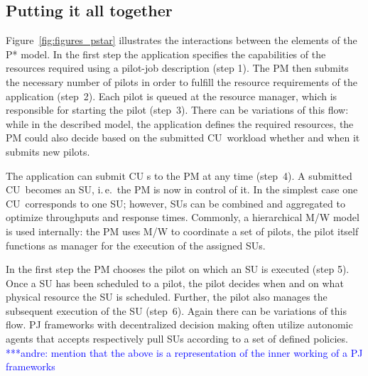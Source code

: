 \documentclass[conference,final]{IEEEtran}
\newcommand{\alnote}[1]{ {\textcolor{blue} { ***andre: #1 }}}
\newcommand{\alnote}[1]{}
\newcommand{\cu}{CU\xspace}
\begin{document}
\subsection{Putting it all together} 
Figure~\ref{fig:figures_pstar}
illustrates the interactions between the elements of the P* model. In
the first step the application specifies the capabilities of the
resources required using a pilot-job description (step 1). The PM then
submits the necessary number of pilots in order to fulfill the
resource requirements of the application (step~2). Each pilot is
queued at the resource manager, which is responsible for starting the
pilot (step~3). There can be variations of this flow: while in the
described model, the application defines the required resources, the
PM could also decide based on the submitted \cu \ workload whether and
when it submits new pilots.

The application can submit \cu s to the PM at any time (step~4). A
submitted \cu \ becomes an SU, i.\,e.\ the PM is now in control of it. In
the simplest case one \cu \ corresponds to one SU; however, SUs can be
combined and aggregated to optimize throughputs and response
times. Commonly, a hierarchical M/W model is used internally: the PM
uses M/W to coordinate a set of pilots, the pilot itself functions as
manager for the execution of the assigned SUs.

In the first step the PM chooses the pilot on which an SU is executed
(step 5). Once a SU has been scheduled to a pilot, the pilot decides
when and on what physical resource the SU is scheduled. Further, the
pilot also manages the subsequent execution of the SU (step~6).  Again
there can be variations of this flow. PJ frameworks with decentralized
decision making often utilize autonomic agents that accepts
respectively pull SUs according to a set of defined policies.
\alnote{mention that the above is a representation of the inner working of a PJ
frameworks}
\end{document}
